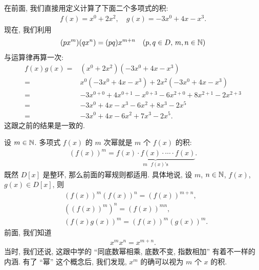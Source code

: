 \begin{example}
    在前面, 我们直接用定义计算了下面二个多项式的积:
    \begin{align*}
        f(x) = x^0 + 2x^2, \quad g(x) = -3x^0 + 4x - x^3.
    \end{align*}
    现在, 我们利用
    \begin{align*}
        (px^m) (qx^n) = (pq) x^{m+n} \quad (p,q \in D, \, m,n \in \mathbb{N})
    \end{align*}
    与运算律再算一次:
    \begin{align*}
        f(x) g(x)
        = {} & (x^0 + 2x^2) (-3x^0 + 4x - x^3)                                 \\
        = {} & x^0 (-3x^0 + 4x - x^3) + 2x^2 (-3x^0 + 4x - x^3)                \\
        = {} & -3x^{0+0} + 4x^{0+1} - x^{0+3} - 6x^{2+0} + 8x^{2+1} - 2x^{2+3} \\
        = {} & -3x^0 + 4x - x^3 - 6x^2 + 8x^3 - 2x^5                           \\
        = {} & -3x^0 + 4x - 6x^2 + 7x^3 - 2x^5.
    \end{align*}
    这跟之前的结果是一致的.
\end{example}

\begin{definition}
    设 $m \in \mathbb{N}$. 多项式 $f(x)$ 的 $m$ 次幂就是 $m$ 个 $f(x)$ 的积:
    \begin{align*}
        (f(x))^m = \underbrace{f(x) \cdot f(x) \cdot \cdots \cdot f(x)}_{\text{$m$ $f(x)$'s}}.
    \end{align*}
    既然 $D[x]$ 是整环, 那么前面的幂规则都适用. 具体地说, 设 $m$, $n \in \mathbb{N}$, $f(x)$, $g(x) \in D[x]$, 则
    \begin{align*}
         & (f(x))^m (f(x))^n = (f(x))^{m+n},  \\
         & ((f(x))^m)^n = (f(x))^{mn},        \\
         & (f(x) g(x))^m = (f(x))^m (g(x))^m.
    \end{align*}
    前面, 我们知道
    \begin{align*}
        x^m x^n = x^{m+n}.
    \end{align*}
    当时, 我们还说, 这跟中学的 ``同底数幂相乘, 底数不变, 指数相加'' 有着不一样的内涵. 有了 ``幂'' 这个概念后, 我们发现, $x^m$ 的确可以视为 $m$ 个 $x$ 的积.
\end{definition}

